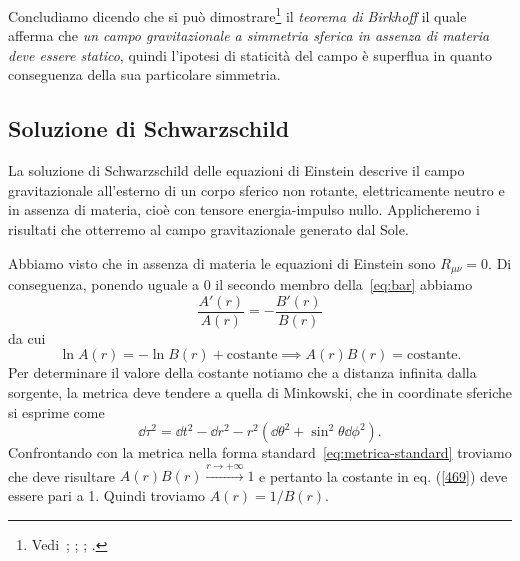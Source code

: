 Concludiamo dicendo che si può
dimostrare\footnote{Vedi~\textcite[390-393]{landau:campi};
  \textcite[843-844]{misner:gravitation};
  \textcite[337-340]{ohanian:gravitazione};
  \textcite[335-337]{weinberg:gravitation}.}  il \emph{teorema di Birkhoff} il quale afferma che \emph{un campo
  gravitazionale a simmetria sferica in assenza di materia deve essere statico},
quindi l'ipotesi di staticità del campo è superflua in quanto conseguenza della
sua particolare simmetria.

\subsection{Soluzione di Schwarzschild}
\label{sec:metrica-schwarzschild}

La soluzione di Schwarzschild delle equazioni di Einstein descrive il campo
gravitazionale all'esterno di un corpo sferico non rotante, elettricamente
neutro e in assenza di materia, cioè con tensore energia-impulso nullo.
Applicheremo i risultati che otterremo al campo gravitazionale generato dal
Sole.

Abbiamo visto che in assenza di materia le equazioni di Einstein sono 
$R_{\mu\nu} = 0$.  Di conseguenza, ponendo uguale a $0$ il secondo membro
della~\eqref{eq:bar} abbiamo
\begin{equation}
  \frac{A'(r)}{A(r)} = -\frac{B'(r)}{B(r)}
\end{equation}
da cui
\begin{equation}
  \ln A(r) = - \ln B(r) + \text{costante} \implies A(r)B(r) = \text{costante}.
\label{468}
\end{equation}
Per determinare il valore della costante notiamo che a distanza infinita dalla
sorgente, la metrica deve tendere a quella di Minkowski, che in coordinate
sferiche si esprime come
\begin{equation}
  \dd\tau^{2} = \dd t^{2} -\dd r^{2} - r^{2}(\dd\theta^{2} + \sin^{2}\theta
  \dd\phi^{2}).
\end{equation}
Confrontando con la metrica nella forma standard~\eqref{eq:metrica-standard}
troviamo che deve risultare $A(r) B(r) \xrightarrow{r \to +\infty} 1$ e pertanto
la costante in eq. (\ref{469}) deve essere pari a 1.  Quindi troviamo $A(r) =
1/B(r)$.

